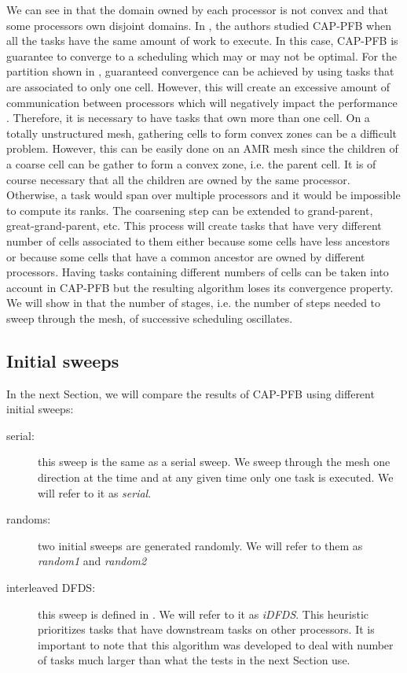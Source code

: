 \documentclass{mc2015}
\renewcommand{\(}{\left(}
\renewcommand{\)}{\right)}
\renewcommand{\[}{\left[}
\renewcommand{\]}{\right]}
\begin{document}
We can see in  that the domain owned by each processor is not
convex and that some
processors own disjoint domains. In \cite{Mo2014}, the authors studied CAP-PFB
when all the tasks have the same amount of work to execute. In this case,
CAP-PFB is guarantee to converge to a scheduling which may or may not be
optimal. For the partition shown in , guaranteed convergence can be achieved by using
tasks that are associated to only one cell. However, this will create an
excessive amount of communication between processors which will negatively impact the performance
\cite{Pautz2002}. Therefore, it is necessary to have tasks that own more than
one cell. On a totally unstructured mesh, gathering cells to form convex zones
can be a difficult problem. However, this can be easily done on an AMR mesh since the
children of a coarse cell can be gather to form a convex zone, i.e. the parent
cell. It is of course necessary that all the children are owned by the same
processor. Otherwise, a task would span over multiple processors and
it would be impossible to compute its ranks. The coarsening step 
can be extended to grand-parent, great-grand-parent, etc. This process will create
tasks that have very different number of cells associated to them either
because some cells have less ancestors or because some cells that have a common
ancestor are owned by different processors. Having tasks containing different
numbers of cells can be taken into account in CAP-PFB but the resulting
algorithm loses its convergence property. We will show in  that
the number of stages, i.e. the number of steps needed to sweep through the mesh,
of successive scheduling oscillates.

\subsection{Initial sweeps}

In the next Section, we will compare the results of CAP-PFB using different initial sweeps:
\begin{description}
  \item[serial:] this sweep is the same as a serial sweep. We sweep through the
    mesh one
    direction at the time and at any given time only one task is executed. We
    will refer to it as \emph{serial}.
  \item[randoms:] two initial sweeps are generated randomly. We will refer to
    them as \emph{random1} and \emph{random2}
  \item[interleaved DFDS:] this sweep is defined in \cite{Pautz2002}. We will
    refer to it as \emph{iDFDS}. This heuristic prioritizes tasks that have
    downstream tasks on other processors. It is important to note that this algorithm was
    developed to deal with number of tasks much larger than what the tests in
    the next Section use.
\end{description}
\end{document}

